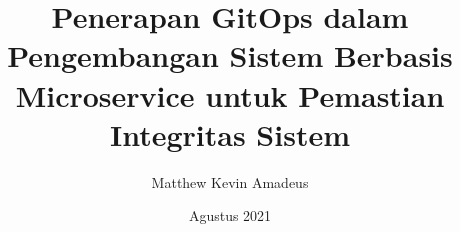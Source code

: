 \title{Penerapan GitOps dalam Pengembangan Sistem Berbasis Microservice untuk Pemastian Integritas Sistem}
\author{Matthew Kevin Amadeus}
\date{Agustus 2021}